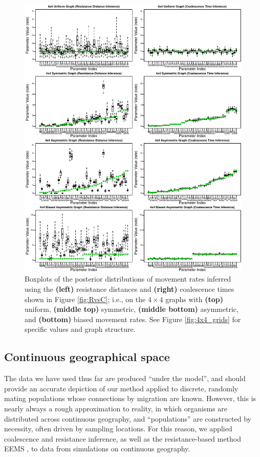 \documentclass{article}
\begin{document}
\begin{figure}
\centering
     \includegraphics[scale=1]{figs/4x4boxplots_paper}
    \caption{
        Boxplots of the posterior distributions of movement rates
        inferred using the
        \textbf{(left)} resistance distances
        and \textbf{(right)} coalescence times
        shown in Figure \ref{fig:RvsC};
        i.e., on the $4 \times 4$ graphs with
        \textbf{(top)} uniform,
        \textbf{(middle top)} symmetric,
        \textbf{(middle bottom)} asymmetric,
        and \textbf{(bottom)} biased
        movement rates.
        See Figure \ref{fig:4x4_grids} for specific values and graph structure.
    \label{fig:4x4box}
}
\end{figure}


\subsection*{Continuous geographical space}

The data we have used thus far are produced ``under the model'',
and should provide an accurate depiction of our method applied to discrete, randomly mating populations
whose connections by migration are known.
However, this is nearly always a rough approximation to reality,
in which organisms are distributed across continuous geography,
and ``populations'' are constructed by necessity, often driven by sampling locations.
For this reason, we applied coalescence and resistance inference,
as well as the resistance-based method EEMS \citep{petkova2016visualizing},
to data from simulations on continuous geography.
\end{document}
